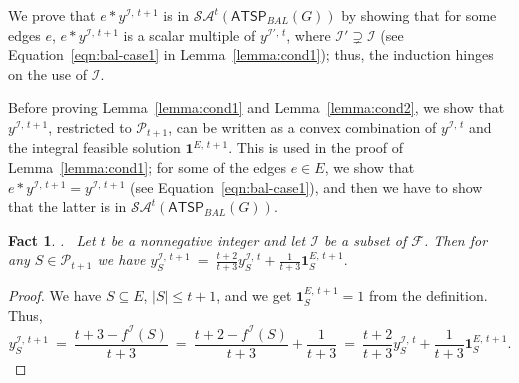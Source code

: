 \documentclass[11pt]{article}
\newtheorem{fact}[theorem]{Fact}
\newcommand{\pop}{\mathcal{P}}
\newcommand{\atspbal}{\homog{\textsf{ATSP$_{\mathit{BAL}}$}}}
\newcommand{\fracset}{\mathcal{F}}
\newcommand{\sgn}{\mathcal{I}}
\newcommand{\yvec}[2]{y^{#1,\,#2}}	\newcommand{\zvec}[2]{y^{#1,\,#2}}	\newcommand{\zveconly}{y}
\newcommand{\onevec}[2]{\textbf{1}^{#1,\,#2}}		\newcommand{\goodfrac}[2]{F^{#1}(#2)}	\newcommand{\szgoodfrac}[2]{f^{#1}(#2)}	\newcommand{\cindex}[1]{\textit{index}(#1)} \newcommand{\indfrac}{h}	\newcommand{\tour}{\textit{tour\/}}
\newcommand{\saop}{\mathcal{SA}}
\newcommand{\homog}[1]{{#1}}
\begin{document}
We prove that $e*\yvec{\sgn}{t+1}$ is in $\saop^t(\homog{\atspbal(G)})$
by showing that for some edges $e$,
$e*\yvec{\sgn}{t+1}$ is a scalar multiple of  $\yvec{\sgn'}{t}$,
where $\sgn'\supsetneq\sgn$
(see Equation~\eqref{eqn:bal-case1} in Lemma~\ref{lemma:cond1});
thus, the induction hinges on the use of $\sgn$.


Before proving Lemma~\ref{lemma:cond1} and Lemma~\ref{lemma:cond2},
we show that $\yvec{\sgn}{t+1}$, restricted to $\pop_{t+1}$,
can be written as a convex combination
of $\yvec{\sgn}{t}$ and the integral feasible solution $\onevec{E}{t+1}$.
This is used in the proof of Lemma~\ref{lemma:cond1};
for some of the edges $e\in E$,
we show that $e * \yvec{\sgn}{t+1} = \yvec{\sgn}{t+1}$
(see Equation~\eqref{eqn:bal-case1}),
and then we have to show that the latter is in $\saop^t(\homog{\atspbal(G)})$.


\begin{fact}.~ \label{fact:recursive}
Let $t$ be a nonnegative integer and let $\sgn$ be a subset of $\fracset$.
Then for any $S\in\pop_{t+1}$ we have \qquad
$\displaystyle \yvec{\sgn}{t+1}_S ~=~ \frac{t+2}{t+3} \yvec{\sgn}{t}_S +
	\frac{1}{t+3}\onevec{E}{t+1}_S.
$
\end{fact}
\begin{proof}
We have $S\subseteq E$, $|S|\leq t+1$, and
we get $\onevec{E}{t+1}_S=1$ from the definition. Thus,
\[ \yvec{\sgn}{t+1}_S ~=~ \frac{t+3-\szgoodfrac{\sgn}{S}}{t+3}
	~=~ \frac{t+2-\szgoodfrac{\sgn}{S}}{t+3}+\frac{1}{t+3}
	~=~ \frac{t+2}{t+3} \yvec{\sgn}{t}_S+\frac{1}{t+3}\onevec{E}{t+1}_S.
\]
\end{proof}
\end{document}
